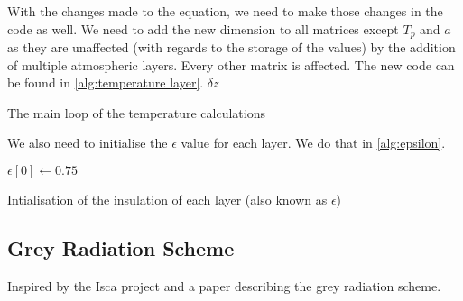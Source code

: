 With the changes made to the equation, we need to make those changes in the code as well. We need to add the new dimension to all matrices except $T_p$ and $a$ as they are unaffected (with 
regards to the storage of the values) by the addition of multiple atmospheric layers. Every other matrix is affected. The new code can be found in \autoref{alg:temperature layer}. $\delta z$

\begin{algorithm}[hbt]
    \SetAlgoLined
    \caption{The main loop of the temperature calculations}
    \label{alg:temperature layer}
\end{algorithm}

We also need to initialise the $\epsilon$ value for each layer. We do that in \autoref{alg:epsilon}.

\begin{algorithm}
    $\epsilon[0] \leftarrow 0.75$ \;
    \caption{Intialisation of the insulation of each layer (also known as $\epsilon$)}
    \label{alg:epsilon}
\end{algorithm}

\subsection{Grey Radiation Scheme}
Inspired by the Isca project \cite{isca} and a paper describing the grey radiation scheme\cite{greyRad}.


